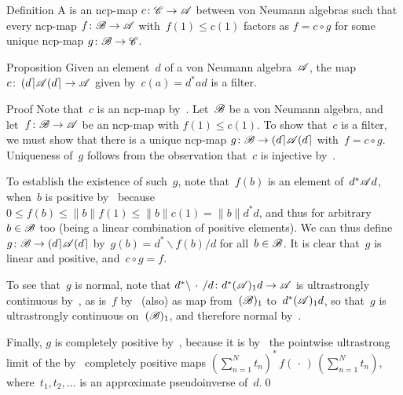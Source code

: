 \documentclass[a]{subfiles}
\begin{document}
\begin{parsec}%
\begin{point}[filter]{Definition}%
A 
is an ncp-map $c\colon \mathscr{C}\to\mathscr{A}$
between von Neumann algebras
such that every ncp-map $f\colon \mathscr{B}\to\mathscr{A}$
with~$f(1)\leq c(1)$
factors as $f=c\circ g$
for some unique ncp-map $g \colon \mathscr{B}\to\mathscr{C}$.
\end{point}
\begin{point}{Proposition}%
Given an element~$d$ of a von Neumann algebra~$\mathscr{A}$,
the map $c\colon \left(d\right\rceil\!\mathscr{A}\!\left(d\right\rceil\to\mathscr{A}$
given by~$c(a)=d^*ad$
is a filter.
\begin{point}{Proof}%
Note that~$c$ is an ncp-map by~.
Let~$\mathscr{B}$ be a von Neumann algebra,
and let~$f\colon \mathscr{B}\to\mathscr{A}$ be an ncp-map
with $f(1)\leq c(1)$.
To show that~$c$ is a filter,
we must show that there is a unique ncp-map
$g\colon \mathscr{B}\to
\left(d\right\rceil\!\mathscr{A}\!\left(d\right\rceil$
with~$f=c\circ g$.
Uniqueness of~$g$ follows from the observation
that~$c$ is injective by~.

To establish the existence of such~$g$,
note that~$f(b)$ is an element of~$d^*\mathscr{A} d$,
when~$b$ is positive
by~
because~$0\leq f(b)\leq \|b\|f(1)\leq \|b\| c(1)=\|b\|d^*d$,
and thus for arbitrary~$b\in\mathscr{B}$ too
(being a linear combination
of positive elements).
We can thus define $g\colon \mathscr{B}\to \left(d\right\rceil\!\mathscr{A}\!\left(d\right\rceil$
by~$g(b)=d^*\backslash f(b)/d$
for all~$b\in\mathscr{B}$.
It is clear that~$g$ is linear and positive,
and~$c\circ g=f$.

To see that~$g$ is normal,
note that
$d^*\backslash\,\cdot\,/d\colon
d^*(\mathscr{A})_1 d\to\mathscr{A}$
is ultrastrongly continuous by~,
as is~$f$ by~
(also) as map from~$(\mathscr{B})_1$ to~$d^*(\mathscr{A})_1 d$,
so that~$g$ is ultrastrongly continuous on~$(\mathscr{B})_1$,
and therefore normal by~.

Finally, $g$ is completely positive
by~,
because it is by~
the pointwise ultrastrong limit
of the by~ completely positive maps
$(\sum_{n=1}^Nt_n)^* \,f(\,\cdot\,)\,(\sum_{n=1}^N t_n)$,
where~$t_1,t_2,\dotsc$
is an approximate pseudoinverse of~$d$.\qed
\end{point}
\end{point}
\end{parsec}
\end{document}
